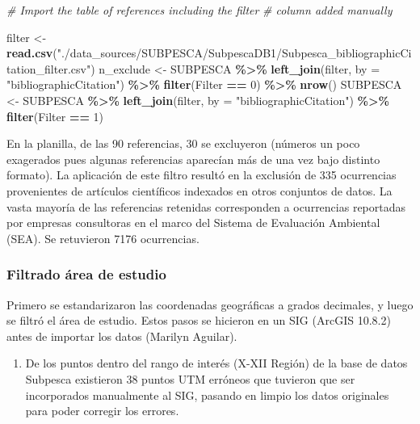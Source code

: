 \documentclass[sn-apa,pdflatex]{sn-jnl}
\newenvironment{Shaded}{\begin{snugshade}}{\end{snugshade}}
\newcommand{\AttributeTok}[1]{\textcolor[rgb]{0.13,0.29,0.53}{#1}}
\newcommand{\CommentTok}[1]{\textcolor[rgb]{0.56,0.35,0.01}{\textit{#1}}}
\newcommand{\DecValTok}[1]{\textcolor[rgb]{0.00,0.00,0.81}{#1}}
\newcommand{\FunctionTok}[1]{\textcolor[rgb]{0.13,0.29,0.53}{\textbf{#1}}}
\newcommand{\NormalTok}[1]{#1}
\newcommand{\OtherTok}[1]{\textcolor[rgb]{0.56,0.35,0.01}{#1}}
\newcommand{\SpecialCharTok}[1]{\textcolor[rgb]{0.81,0.36,0.00}{\textbf{#1}}}
\newcommand{\StringTok}[1]{\textcolor[rgb]{0.31,0.60,0.02}{#1}}
\providecommand{\tightlist}{%
  \setlength{\itemsep}{0pt}\setlength{\parskip}{0pt}}
\begin{document}
\begin{Shaded}
\begin{Highlighting}[]
\CommentTok{\# Import the table of references including the filter}
\CommentTok{\# column added manually}

\NormalTok{filter }\OtherTok{\textless{}{-}} \FunctionTok{read.csv}\NormalTok{(}\StringTok{"./data\_sources/SUBPESCA/SubpescaDB1/Subpesca\_bibliographicCitation\_filter.csv"}\NormalTok{)}
\NormalTok{n\_exclude }\OtherTok{\textless{}{-}}\NormalTok{ SUBPESCA }\SpecialCharTok{\%\textgreater{}\%}
    \FunctionTok{left\_join}\NormalTok{(filter, }\AttributeTok{by =} \StringTok{"bibliographicCitation"}\NormalTok{) }\SpecialCharTok{\%\textgreater{}\%}
    \FunctionTok{filter}\NormalTok{(Filter }\SpecialCharTok{==} \DecValTok{0}\NormalTok{) }\SpecialCharTok{\%\textgreater{}\%}
    \FunctionTok{nrow}\NormalTok{()}
\NormalTok{SUBPESCA }\OtherTok{\textless{}{-}}\NormalTok{ SUBPESCA }\SpecialCharTok{\%\textgreater{}\%}
    \FunctionTok{left\_join}\NormalTok{(filter, }\AttributeTok{by =} \StringTok{"bibliographicCitation"}\NormalTok{) }\SpecialCharTok{\%\textgreater{}\%}
    \FunctionTok{filter}\NormalTok{(Filter }\SpecialCharTok{==} \DecValTok{1}\NormalTok{)}
\end{Highlighting}
\end{Shaded}

En la planilla, de las 90 referencias, 30 se excluyeron (números un poco
exagerados pues algunas referencias aparecían más de una vez bajo
distinto formato). La aplicación de este filtro resultó en la exclusión
de 335 ocurrencias provenientes de artículos científicos indexados en
otros conjuntos de datos. La vasta mayoría de las referencias retenidas
corresponden a ocurrencias reportadas por empresas consultoras en el
marco del Sistema de Evaluación Ambiental (SEA). Se retuvieron 7176
ocurrencias.

\subsubsection{Filtrado área de
estudio}\label{filtrado-uxe1rea-de-estudio-4}

Primero se estandarizaron las coordenadas geográficas a grados
decimales, y luego se filtró el área de estudio. Estos pasos se hicieron
en un SIG (ArcGIS 10.8.2) antes de importar los datos (Marilyn Aguilar).

\begin{enumerate}
\def\labelenumi{\arabic{enumi}.}
\tightlist
\item
  De los puntos dentro del rango de interés (X-XII Región) de la base de
  datos Subpesca existieron 38 puntos UTM erróneos que tuvieron que ser
  incorporados manualmente al SIG, pasando en limpio los datos
  originales para poder corregir los errores.
\end{enumerate}
\end{document}
